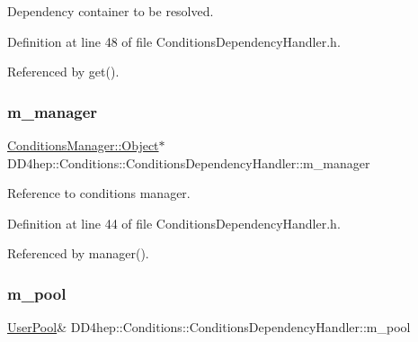 Dependency container to be resolved. 



Definition at line 48 of file Conditions\+Dependency\+Handler.\+h.



Referenced by get().

\hypertarget{class_d_d4hep_1_1_conditions_1_1_conditions_dependency_handler_a9c245445c4fd8c00c7e80ff67eb1ab3a}{}\label{class_d_d4hep_1_1_conditions_1_1_conditions_dependency_handler_a9c245445c4fd8c00c7e80ff67eb1ab3a} 
\subsubsection{\texorpdfstring{m\+\_\+manager}{m\_manager}}
{\footnotesize\ttfamily \hyperlink{class_d_d4hep_1_1_conditions_1_1_conditions_manager_ae865f49d144d8ba5be9eec3e1d8fec94}{Conditions\+Manager\+::\+Object}$\ast$ D\+D4hep\+::\+Conditions\+::\+Conditions\+Dependency\+Handler\+::m\+\_\+manager\hspace{0.3cm}{\ttfamily [protected]}}



Reference to conditions manager. 



Definition at line 44 of file Conditions\+Dependency\+Handler.\+h.



Referenced by manager().

\hypertarget{class_d_d4hep_1_1_conditions_1_1_conditions_dependency_handler_a71ec45fb6d8dabbf7e055687ab8bea5a}{}\label{class_d_d4hep_1_1_conditions_1_1_conditions_dependency_handler_a71ec45fb6d8dabbf7e055687ab8bea5a} 
\subsubsection{\texorpdfstring{m\+\_\+pool}{m\_pool}}
{\footnotesize\ttfamily \hyperlink{class_d_d4hep_1_1_conditions_1_1_user_pool}{User\+Pool}\& D\+D4hep\+::\+Conditions\+::\+Conditions\+Dependency\+Handler\+::m\+\_\+pool\hspace{0.3cm}{\ttfamily [protected]}}



